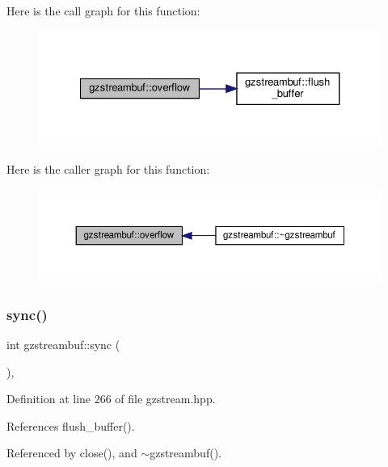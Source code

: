 Here is the call graph for this function\+:
\nopagebreak
\begin{figure}[H]
\begin{center}
\leavevmode
\includegraphics[width=327pt]{d7/de3/classgzstreambuf_a3152b230147cdb768bf87cf4009963ff_cgraph}
\end{center}
\end{figure}
Here is the caller graph for this function\+:
\nopagebreak
\begin{figure}[H]
\begin{center}
\leavevmode
\includegraphics[width=350pt]{d7/de3/classgzstreambuf_a3152b230147cdb768bf87cf4009963ff_icgraph}
\end{center}
\end{figure}
\mbox{\label{classgzstreambuf_afec93b74f334978be8a0e9bd0ec6eee6}} 
\subsubsection{\texorpdfstring{sync()}{sync()}}
{\footnotesize\ttfamily int gzstreambuf\+::sync (\begin{DoxyParamCaption}{ }\end{DoxyParamCaption})\hspace{0.3cm}{\ttfamily [inline]}, {\ttfamily [override]}}



Definition at line 266 of file gzstream.\+hpp.



References flush\+\_\+buffer().



Referenced by close(), and $\sim$gzstreambuf().

